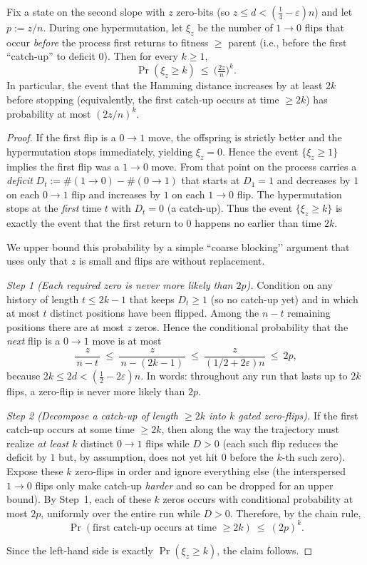 \begin{lemma}\label{lem:xi-tail}
	Fix a state on the second slope with $z$ zero-bits (so $z\le d<(\tfrac14-\varepsilon)n$) and let $p:=z/n$.
	During one hypermutation, let $\xi_z$ be the number of $1\!\to 0$ flips that occur \emph{before} the process first returns to fitness $\ge$ parent (i.e., before the first ``catch-up'' to deficit $0$). Then for every $k\ge 1$,
	\[
	\Pr(\xi_z\ge k)\ \le\ \Big(\tfrac{2z}{n}\Big)^k.
	\]
	In particular, the event that the Hamming distance increases by at least $2k$ before stopping (equivalently, the first catch-up occurs at time $\ge 2k$) has probability at most $(2z/n)^k$.
\end{lemma}

\begin{proof}
	If the first flip is a $0\!\to 1$ move, the offspring is strictly better and the hypermutation stops immediately, yielding $\xi_z=0$. Hence the event $\{\xi_z\ge 1\}$ implies the first flip was a $1\!\to 0$ move. From that point on the process carries a \emph{deficit} $D_t:=\#(1\!\to 0)-\#(0\!\to 1)$ that starts at $D_1=1$ and decreases by $1$ on each $0\!\to 1$ flip and increases by $1$ on each $1\!\to 0$ flip. The hypermutation stops at the \emph{first} time $t$ with $D_t=0$ (a catch-up). Thus the event $\{\xi_z\ge k\}$ is exactly the event that the first return to $0$ happens no earlier than time $2k$.
	
	We upper bound this probability by a simple ``coarse blocking’’ argument that uses only that $z$ is small and flips are without replacement.
	
	\smallskip
	\emph{Step 1 (Each required zero is never more likely than $2p$).}
	Condition on any history of length $t\le 2k-1$ that keeps $D_t\ge 1$ (so no catch-up yet) and in which at most $t$ distinct positions have been flipped. Among the $n-t$ remaining positions there are at most $z$ zeros. Hence the conditional probability that the \emph{next} flip is a $0\!\to 1$ move is at most
	\[
	\frac{z}{\,n-t\,}\ \le\ \frac{z}{\,n-(2k-1)\,}\ \le\ \frac{z}{(1/2+2\varepsilon)n}\ \le\ 2p,
	\]
	because $2k\le 2d<(\tfrac12-2\varepsilon)n$. In words: throughout any run that lasts up to $2k$ flips, a zero-flip is never more likely than $2p$.
	
	\smallskip
	\emph{Step 2 (Decompose a catch-up of length $\ge 2k$ into $k$ gated zero-flips).}
	If the first catch-up occurs at some time $\ge 2k$, then along the way the trajectory must realize \emph{at least $k$} distinct $0\!\to 1$ flips while $D>0$ (each such flip reduces the deficit by $1$ but, by assumption, does not yet hit $0$ before the $k$-th such zero). Expose these $k$ zero-flips in order and ignore everything else (the interspersed $1\!\to 0$ flips only make catch-up \emph{harder} and so can be dropped for an upper bound). By Step~1, each of these $k$ zeros occurs with conditional probability at most $2p$, uniformly over the entire run while $D>0$. Therefore, by the chain rule,
	\[
	\Pr(\text{first catch-up occurs at time }\ge 2k)\ \le\ (2p)^k.
	\]
	
	
	Since the left-hand side is exactly $\Pr(\xi_z\ge k)$, the claim follows.
\end{proof}

